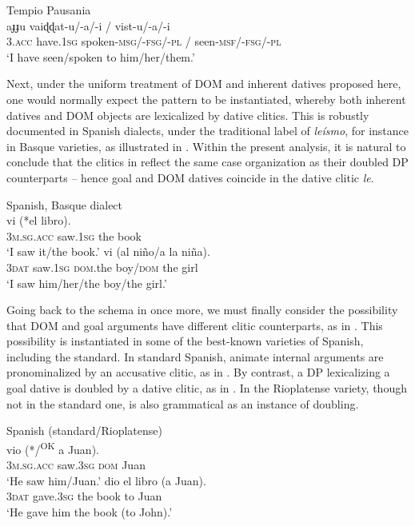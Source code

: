 \documentclass[output=paper,colorlinks,citecolor=brown,nonflat]{./langscibook}
\begin{document}
\ea%
    \label{ex:manzini:22}
    Tempio Pausania \citep{ManziniSavoia2005}\\
        {aɟɟu}     {vaiɖɖat-u/-a/-i}  /  {vist-u/-a/-i}\\
        \textsc{3.acc}  have.\textsc{1sg}   spoken-\textsc{msg/-fsg/-pl} / seen-\textsc{msf/-fsg/-pl}\\
    \glt ‘I have seen/spoken to him/her/them.’
\z


Next, under the uniform treatment of DOM and inherent datives proposed here, one would normally expect the pattern  to be instantiated, whereby both inherent datives and DOM objects are lexicalized by dative clitics. This is robustly documented in Spanish dialects, under the traditional label of \textit{leísmo}, for instance in Basque varieties, as illustrated in . Within the present analysis, it is natural to conclude that the clitics in  reflect the same case organization as their doubled DP counterparts – hence goal and DOM datives coincide in the dative clitic \textit{le}.  

\ea%
    \label{ex:manzini:23}
    Spanish, Basque dialect \citep{OrmazabalRomero2013Probus}\\
    \ea\label{ex:manzini:23a}      {vi}     (*el libro).\\
        \textsc{3m.sg.acc}  saw.\textsc{1sg}  {\db}the book\\
    \glt ‘I saw it/the book.’
    \ex\label{ex:manzini:23b}    {vi}     (al niño/a la niña).\\
        \textsc{3dat}  saw.\textsc{1sg}  \textsc{dom}.the boy/\textsc{dom} the girl\\
    \glt ‘I saw him/her/the boy/the girl.’
    \z
\z

Going back to the schema in  once more, we must finally consider the possibility that DOM and goal arguments have different clitic counterparts, as in . This possibility is instantiated in some of the best-known varieties of Spanish, including the standard. In standard Spanish, animate internal arguments are pronominalized by an accusative clitic, as in . By contrast, a DP lexicalizing a goal dative is doubled by a dative clitic, as in . In the Rioplatense variety, though not in the standard one,  is also grammatical as an instance of doubling.

\ea%
    \label{ex:manzini:24}
    Spanish (standard/Rioplatense)\\
    \ea\label{ex:manzini:24a} 
         {vio}    (*/\textsuperscript{OK} {a} Juan).\\
        \textsc{3m.sg.acc}  saw.\textsc{3sg}  \textsc{dom} Juan\\
    \glt ‘He saw him/Juan.’
    \ex\label{ex:manzini:24b} 
       {dio}     {el} {libro}   (a Juan).\\
        \textsc{3dat}   gave.\textsc{3sg}  the book   to Juan\\
    \glt ‘He gave him the book (to John).’
    \z
\z
\end{document}
